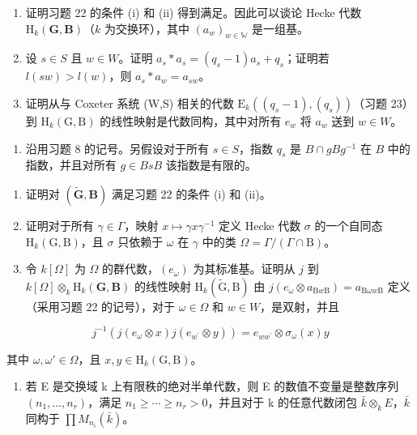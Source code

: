 \begin{enumerate}
\def\labelenumi{\alph{enumi})}
\item
  证明习题 22 的条件 (i) 和 (ii) 得到满足。因此可以谈论 Hecke 代数 \(\mathrm{H}_k(\mathbf{G},\mathbf{B})\)（\(k\) 为交换环），其中 \((a_w)_{w\in \mathbb{W}}\) 是一组基。
\item
  设 \(s \in S\) 且 \(w \in W\)。证明 \(a_s * a_s = (q_s - 1)a_s + q_s\)；证明若 \(l(sw) > l(w)\)，则 \(a_s * a_w = a_{sw}\)。
\item
  证明从与 Coxeter 系统 (W,S) 相关的代数 \(\mathrm{E}_{k}((q_{s}-1),(q_{s}))\)（习题 23）到 \(\mathrm{H}_{k}(\mathrm{G},\mathrm{B})\) 的线性映射是代数同构，其中对所有 \(e_{w}\) 将 \(a_{w}\) 送到 \(w \in W\)。
\end{enumerate}

\begin{enumerate}
\def\labelenumi{\arabic{enumi})}
\setcounter{enumi}{24}
\tightlist
\item
  沿用习题 8 的记号。另假设对于所有 \(s \in S\)，指数 \(q_s\) 是 \(B \cap gBg^{-1}\) 在 \(B\) 中的指数，并且对所有 \(g \in BsB\) 该指数是有限的。
\end{enumerate}

\begin{enumerate}
\def\labelenumi{\alph{enumi})}
\item
  证明对 \((\tilde{\mathbf{G}},\mathbf{B})\) 满足习题 22 的条件 (i) 和 (ii)。
\item
  证明对于所有 \(\gamma \in \Gamma\)，映射 \(x \mapsto \gamma x \gamma^{-1}\) 定义 Hecke 代数 \(\sigma\) 的一个自同态 \(\mathrm{H}_k(\mathrm{G}, \mathrm{B})\)，且 \(\sigma\) 只依赖于 \(\omega\) 在 \(\gamma\) 中的类 \(\Omega = \Gamma / (\Gamma \cap \mathrm{B})\)。
\item
  令 \(k[\Omega]\) 为 \(\Omega\) 的群代数，\((e_{\omega})\) 为其标准基。证明从 \(j\) 到 \(k[\Omega] \otimes_k \mathrm{H}_k(\mathbf{G}, \mathbf{B})\) 的线性映射 \(\mathrm{H}_k(\tilde{\mathrm{G}}, \mathrm{B})\) 由 \(j(e_{\omega} \otimes a_{\mathrm{B}w\mathrm{B}}) = a_{\mathrm{B}\omega w\mathrm{B}}\) 定义（采用习题 22 的记号），对于 \(\omega \in \Omega\) 和 \(w \in W\)，是双射，并且
\end{enumerate}

\[
j ^ {- 1} (j (e _ {\omega} \otimes x) j (e _ {w ^ {\prime}} \otimes y)) = e _ {w w ^ {\prime}} \otimes \sigma_ {\omega} (x) y
\]

其中 \(\omega, \omega' \in \Omega\)，且 \(x, y \in \mathrm{H}_k(\mathrm{G}, \mathrm{B})\)。

\begin{enumerate}
\def\labelenumi{\arabic{enumi})}
\setcounter{enumi}{25}
\tightlist
\item
  若 E 是交换域 k 上有限秩的绝对半单代数，则 E 的数值不变量是整数序列 \((n_{1},\ldots,n_{r})\)，满足 \(n_{1}\geqslant\cdots\geqslant n_{r}>0\)，并且对于 k 的任意代数闭包 \(\bar{k}\otimes_{k}E\)，\(\bar{k}\) 同构于 \(\prod M_{n_{i}}(\bar{k})\)。
\end{enumerate}

